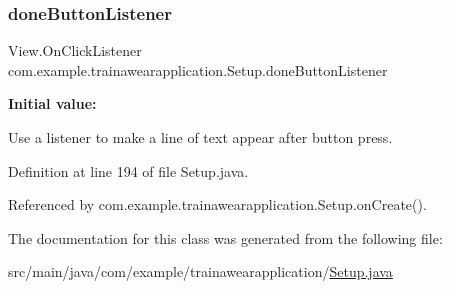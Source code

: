 \subsubsection{\texorpdfstring{doneButtonListener}{doneButtonListener}}
{\footnotesize\ttfamily View.\+On\+Click\+Listener com.\+example.\+trainawearapplication.\+Setup.\+done\+Button\+Listener\hspace{0.3cm}{\ttfamily [private]}}

{\bfseries Initial value\+:}
\begin{DoxyCode}{0}
\DoxyCodeLine{            }
\DoxyCodeLine{}
\DoxyCodeLine{        \}}
\DoxyCodeLine{    \}}

\end{DoxyCode}


Use a listener to make a line of text appear after button press. 



Definition at line 194 of file Setup.\+java.



Referenced by com.\+example.\+trainawearapplication.\+Setup.\+on\+Create().



The documentation for this class was generated from the following file\+:\begin{DoxyCompactItemize}
\item 
src/main/java/com/example/trainawearapplication/\mbox{\hyperlink{_setup_8java}{Setup.\+java}}\end{DoxyCompactItemize}
